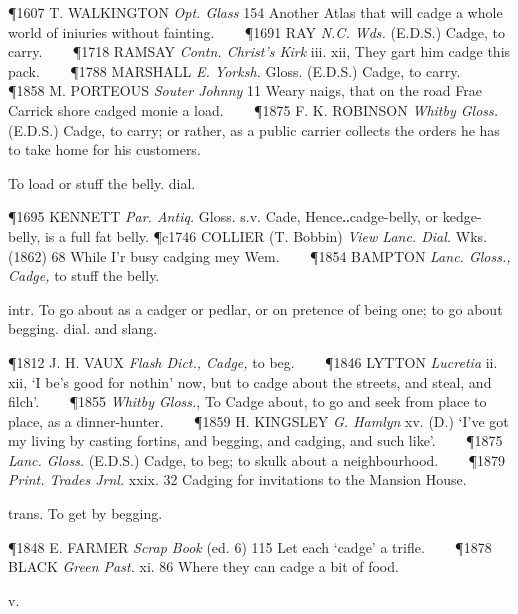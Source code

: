\begin{description}[wide, labelwidth=!, labelindent=0pt]
\begin{myenumerate}
\P 1607 T. WALKINGTON  \textit{Opt. Glass} 154 Another Atlas that will cadge a whole world of iniuries without fainting.    
\P 1691 RAY  \textit{N.C. Wds.} (E.D.S.) Cadge, to carry.    
\P 1718 RAMSAY  \textit{Contn. Christ's Kirk} iii. xii, They gart him cadge this pack.    
\P 1788 MARSHALL  \textit{E. Yorksh.} Gloss. (E.D.S.) Cadge, to carry.    
\P 1858 M. PORTEOUS  \textit{Souter Johnny} 11 Weary naigs, that on the road Frae Carrick shore cadged monie a load.    
\P 1875 F. K. ROBINSON  \textit{Whitby Gloss.} (E.D.S.) Cadge, to carry; or rather, as a public carrier collects the orders he has to take home for his customers.

 To load or stuff the belly. dial.

\P 1695 KENNETT  \textit{Par. Antiq.} Gloss. s.v. Cade, Hence‥cadge-belly, or kedge-belly, is a full fat belly.
\P c1746 COLLIER  (T. Bobbin) \textit{View Lanc. Dial.} Wks. (1862) 68 While I'r busy cadging mey Wem.    
\P 1854 BAMPTON  \textit{Lanc. Gloss., Cadge,} to stuff the belly.

 intr. To go about as a cadger or pedlar, or on pretence of being one; to go about begging. dial. and slang.

\P 1812 J. H. VAUX  \textit{Flash Dict., Cadge,} to beg.    
\P 1846 LYTTON  \textit{Lucretia} ii. xii, ‘I be's good for nothin' now, but to cadge about the streets, and steal, and filch’.    
\P 1855 \textit{Whitby  Gloss.}, To Cadge about, to go and seek from place to place, as a dinner-hunter.    
\P 1859 H. KINGSLEY  \textit{G. Hamlyn} xv. (D.) ‘I've got my living by casting fortins, and begging, and cadging, and such like’.    
\P 1875 \textit{Lanc.  Gloss.} (E.D.S.) Cadge, to beg; to skulk about a neighbourhood.    
\P 1879 \textit{Print. Trades Jrnl.} xxix. 32 Cadging for invitations to the Mansion House.

 trans. To get by begging.

\P 1848 E. FARMER  \textit{Scrap Book} (ed. 6) 115 Let each ‘cadge’ a trifle.    
\P 1878 BLACK  \textit{Green Past.} xi. 86 Where they can cadge a bit of food.
\end{myenumerate}


 v.

\noindent {}


\end{description}
